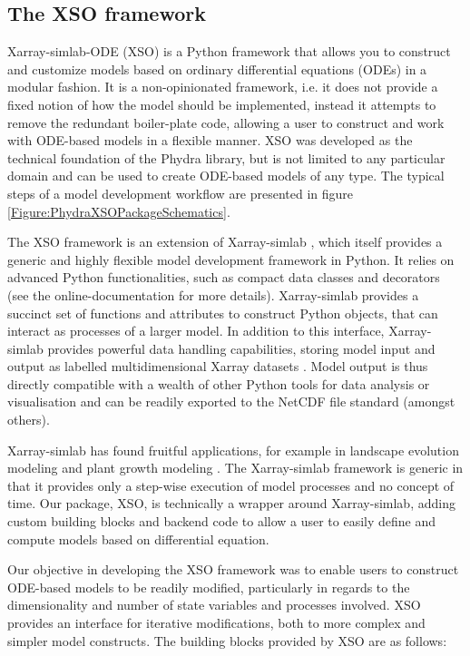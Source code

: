 \documentclass[journal abbreviation, manuscript]{copernicus}
\begin{document}
\subsection{The XSO framework} \label{Section:XSOFramework}


Xarray-simlab-ODE (XSO) is a Python framework that allows you to construct and customize models based on ordinary differential equations (ODEs) in a modular fashion. It is a non-opinionated framework, i.e. it does not provide a fixed notion of how the model should be implemented, instead it attempts to remove the redundant boiler-plate code, allowing a user to construct and work with ODE-based models in a flexible manner. XSO was developed as the technical foundation of the Phydra library, but is not limited to any particular domain and can be used to create ODE-based models of any type. The typical steps of a model development workflow are presented in figure \ref{Figure:PhydraXSOPackageSchematics}.

The XSO framework is an extension of Xarray-simlab \citep{Bovy2018Xarray-simlab:Interactively, Bovy2021Benbovy/xarray-simlab:0.5.0}, which itself provides a generic and highly flexible model development framework in Python. It relies on advanced Python functionalities, such as compact data classes and decorators (see the online-documentation for more details). Xarray-simlab provides a succinct set of functions and attributes to construct Python objects, that can interact as processes of a larger model. In addition to this interface, Xarray-simlab provides powerful data handling capabilities, storing model input and output as labelled multidimensional Xarray datasets \citep{Hoyer2017Xarray:Python}. Model output is thus directly compatible with a wealth of other Python tools for data analysis or visualisation and can be readily exported to the NetCDF file standard (amongst others).

Xarray-simlab has found fruitful applications, for example in landscape evolution modeling \citep{Bovy2021Fastscape-lem/fastscape:V0.1.0beta3} and plant growth modeling \citep{Vaillant2022TowardsDevelopment}. The Xarray-simlab framework is generic in that it provides only a step-wise execution of model processes and no concept of time. Our package, XSO, is technically a wrapper around Xarray-simlab, adding custom building blocks and backend code to allow a user to easily define and compute models based on differential equation.

Our objective in developing the XSO framework was to enable users to construct ODE-based models to be readily modified, particularly in regards to the dimensionality and number of state variables and processes involved. XSO provides an interface for iterative modifications, both to more complex and simpler model constructs. The building blocks provided by XSO are as follows:
\end{document}
